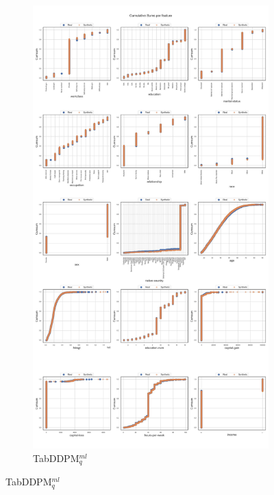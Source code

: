 \newpage
\begin{landscape}
	\begin{figure}[h]
		\centering
		\hfill
		\begin{subfigure}{0.3\linewidth}
			\includegraphics[height=\textheight,width=\linewidth,keepaspectratio]{images/cumsums/tab-ddpm.jpg}
			\caption{TabDDPM$^{ml}_q$}
		\end{subfigure}

\end{figure}
\end{landscape}

